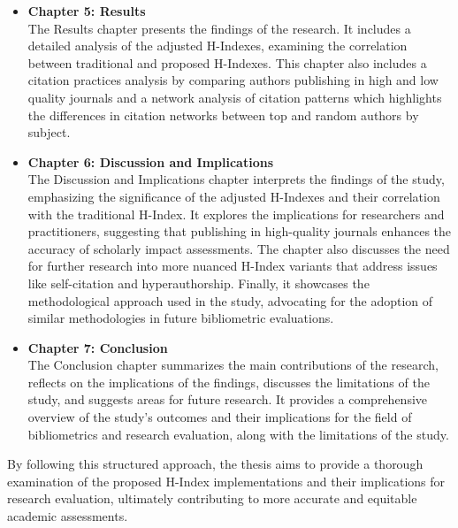 \begin{itemize}
      \item \textbf{Chapter 5: Results} \\
            The Results chapter presents the findings of the research.
            It includes a detailed analysis of the adjusted H-Indexes,
            examining the correlation between traditional and proposed H-Indexes.
            This chapter also includes a citation practices analysis by comparing authors publishing in high and low quality journals
            and a network analysis of citation patterns which highlights the differences in citation networks between
            top and random authors by subject.

      \item \textbf{Chapter 6: Discussion and Implications} \\
            The Discussion and Implications chapter interprets the findings of the study,
            emphasizing the significance of the adjusted H-Indexes and their correlation
            with the traditional H-Index. It explores the implications for researchers and practitioners,
            suggesting that publishing in high-quality journals enhances the accuracy of scholarly impact assessments.
            The chapter also discusses the need for further research into more nuanced H-Index variants that address issues
            like self-citation and hyperauthorship. Finally, it showcases the methodological approach used in the study,
            advocating for the adoption of similar methodologies in future bibliometric evaluations.

      \item \textbf{Chapter 7: Conclusion} \\
            The Conclusion chapter summarizes the main contributions of the research,
            reflects on the implications of the findings, discusses the limitations of the study,
            and suggests areas for future research. It provides a comprehensive overview of the study's
            outcomes and their implications for the field of bibliometrics and research evaluation, along
            with the limitations of the study.
\end{itemize}

By following this structured approach, the thesis aims to provide a thorough
examination of the proposed H-Index implementations and their implications for
research evaluation, ultimately contributing to more accurate and equitable
academic assessments.

